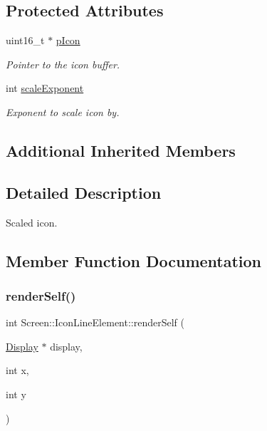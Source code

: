 \subsection*{Protected Attributes}
\begin{DoxyCompactItemize}
\item 
\mbox{\label{classScreen_1_1IconLineElement_ae84108a5bfda7ba013401c067a8c9aca}} 
uint16\+\_\+t $\ast$ \mbox{\hyperlink{classScreen_1_1IconLineElement_ae84108a5bfda7ba013401c067a8c9aca}{p\+Icon}}
\begin{DoxyCompactList}\small\item\em Pointer to the icon buffer. \end{DoxyCompactList}\item 
int \mbox{\hyperlink{classScreen_1_1IconLineElement_a95ab319fab5abe27266a092fdb75b58e}{scale\+Exponent}}
\begin{DoxyCompactList}\small\item\em Exponent to scale icon by. \end{DoxyCompactList}\end{DoxyCompactItemize}
\subsection*{Additional Inherited Members}


\subsection{Detailed Description}
Scaled icon. 

\subsection{Member Function Documentation}
\mbox{\label{classScreen_1_1IconLineElement_a3ee090b31ee5061974552be4688d937b}} 
\subsubsection{\texorpdfstring{render\+Self()}{renderSelf()}}
{\footnotesize\ttfamily int Screen\+::\+Icon\+Line\+Element\+::render\+Self (\begin{DoxyParamCaption}\item[{\mbox{\hyperlink{classDisplay}{Display}} $\ast$}]{display,  }\item[{int}]{x,  }\item[{int}]{y }\end{DoxyParamCaption})\hspace{0.3cm}{\ttfamily [virtual]}}




